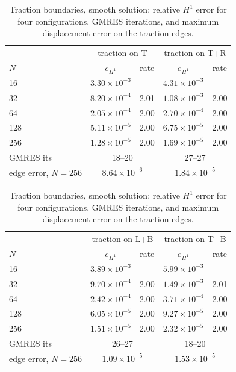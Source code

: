 \documentclass[11pt]{article}
\begin{document}
\begin{table}[htbp]\centering\small
\caption{Traction boundaries, smooth solution: relative $H^1$ error for four configurations, GMRES iterations, and maximum displacement error on the traction edges.}
\begin{tabular}{l cc cc}
\toprule
& \multicolumn{2}{c}{traction on T} & \multicolumn{2}{c}{traction on T+R}\\
$N$ & $e_{H^1}$ & rate & $e_{H^1}$ & rate\\
\midrule
16 & $3.30{\times}10^{-3}$ & -- & $4.31{\times}10^{-3}$ & --\\
32 & $8.20{\times}10^{-4}$ & 2.01 & $1.08{\times}10^{-3}$ & 2.00\\
64 & $2.05{\times}10^{-4}$ & 2.00 & $2.70{\times}10^{-4}$ & 2.00\\
128 & $5.11{\times}10^{-5}$ & 2.00 & $6.75{\times}10^{-5}$ & 2.00\\
256 & $1.28{\times}10^{-5}$ & 2.00 & $1.69{\times}10^{-5}$ & 2.00\\
GMRES its & \multicolumn{2}{c}{18--20} & \multicolumn{2}{c}{27--27}\\
edge error, $N{=}256$ & \multicolumn{2}{c}{$8.64{\times}10^{-6}$} & \multicolumn{2}{c}{$1.84{\times}10^{-5}$}\\
\bottomrule
\end{tabular}

\medskip
\begin{tabular}{l cc cc}
\toprule
& \multicolumn{2}{c}{traction on L+B} & \multicolumn{2}{c}{traction on T+B}\\
$N$ & $e_{H^1}$ & rate & $e_{H^1}$ & rate\\
\midrule
16 & $3.89{\times}10^{-3}$ & -- & $5.99{\times}10^{-3}$ & --\\
32 & $9.70{\times}10^{-4}$ & 2.00 & $1.49{\times}10^{-3}$ & 2.01\\
64 & $2.42{\times}10^{-4}$ & 2.00 & $3.71{\times}10^{-4}$ & 2.00\\
128 & $6.05{\times}10^{-5}$ & 2.00 & $9.27{\times}10^{-5}$ & 2.00\\
256 & $1.51{\times}10^{-5}$ & 2.00 & $2.32{\times}10^{-5}$ & 2.00\\
GMRES its & \multicolumn{2}{c}{26--27} & \multicolumn{2}{c}{18--20}\\
edge error, $N{=}256$ & \multicolumn{2}{c}{$1.09{\times}10^{-5}$} & \multicolumn{2}{c}{$1.53{\times}10^{-5}$}\\
\bottomrule
\end{tabular}
\end{table}
\end{document}
